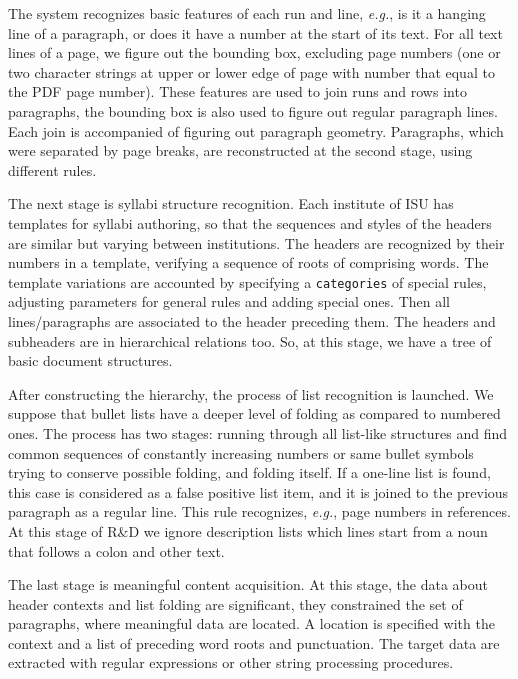 \documentclass[
]{ceurart}
\begin{document}
The system recognizes basic features of each run and line, \emph{e.g.}, is it a hanging line of a paragraph, or does it have a number at the start of its text.  For all text lines of a page, we figure out the bounding box, excluding page numbers (one or two character strings at upper or lower edge of page with number that equal to the PDF page number). These features are used to join runs and rows into paragraphs, the bounding box is also used to figure out regular paragraph lines.  Each join is accompanied of figuring out paragraph geometry. Paragraphs, which were separated by page breaks, are reconstructed at the second stage, using different rules.

The next stage is syllabi structure recognition.  Each institute of ISU has templates for syllabi authoring, so that the sequences and styles of the headers are similar but varying between institutions.  The headers are recognized by their numbers in a template, verifying a sequence of roots of comprising words.  The template variations are accounted by specifying a \verb|categories| of special rules, adjusting parameters for general rules and adding special ones.  Then all lines/paragraphs are associated to the header preceding them.  The headers and subheaders are in hierarchical relations too.  So, at this stage, we have a tree of basic document structures.

After constructing the hierarchy, the process of list recognition is launched.  We suppose that bullet lists have a deeper level of folding as compared to numbered ones.  The process has two stages: running through all list-like structures and find common sequences of constantly increasing numbers or same bullet symbols trying to conserve possible folding, and folding itself.  If a one-line list is found, this case is considered as a false positive list item, and it is joined to the previous paragraph as a regular line.  This rule recognizes, \emph{e.g.}, page numbers in references.  At this stage of R\&D we ignore description lists which lines start from a noun that follows a colon and other text.

The last stage is meaningful content acquisition.  At this stage, the data about header contexts and list folding are significant, they constrained the set of paragraphs, where meaningful data are located.  A location is specified with the context and a list of preceding word roots and punctuation. The target data are extracted with regular expressions or other string processing procedures.
\end{document}
